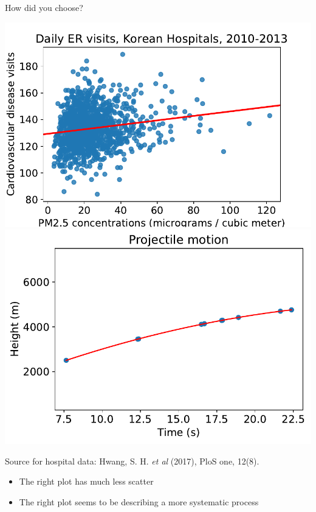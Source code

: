 \documentclass[aspectratio=169]{beamer}
\begin{document}
\begin{frame}{How did you choose?}

\includegraphics[scale=0.475]{data/Huang_et_al/huang_pm25vcirc_regplot.pdf}\includegraphics[scale=0.475]{data/Huang_et_al/projectile.pdf}

\begin{tiny}
Source for hospital data: Hwang, S. H. \textit{et al} (2017), PloS one, 12(8).
\end{tiny}

\pause

\begin{itemize}
\item The right plot has much less scatter
\item The right plot seems to be describing a more systematic process
\end{itemize}


\end{frame}
\end{document}
